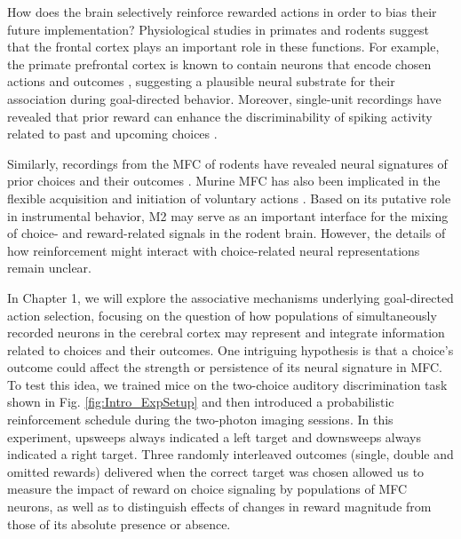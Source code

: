 How does the brain selectively reinforce rewarded actions in order to bias their future implementation? Physiological studies in primates and rodents suggest that the frontal cortex plays an important role in these functions. For example, the primate prefrontal cortex is known to contain neurons that encode chosen actions and outcomes \citep{barraclough2004prefrontal,  genovesio2006representation, seo2007dynamic, histed2009learning}, suggesting a plausible neural substrate for their association during goal-directed behavior. Moreover, single-unit recordings have revealed that prior reward can enhance the discriminability of spiking activity related to past \citep{donahue2013cortical} and upcoming choices \citep{histed2009learning}.

Similarly, recordings from the MFC of rodents have revealed neural signatures of prior choices and their outcomes \citep{sul2010distinct, sul2011role, hyman2017novel}. Murine MFC has also been implicated in the flexible acquisition and initiation of voluntary actions \citep{ostlund2009evidence, gremel2013premotor, murakami2014neural, siniscalchi2016fast, barthas2017secondary, makino2017transformation}. Based on its putative role in instrumental behavior, M2 may serve as an important interface for the mixing of choice- and reward-related signals in the rodent brain. However, the details of how reinforcement might interact with choice-related neural representations remain unclear. 

In Chapter 1, we will explore the associative mechanisms underlying goal-directed action selection, focusing on the question of how populations of simultaneously recorded neurons in the cerebral cortex may represent and integrate information related to choices and their outcomes. One intriguing hypothesis is that a choice’s outcome could affect the strength or persistence of its neural signature in MFC. To test this idea, we trained mice on the two-choice auditory discrimination task shown in Fig. \ref{fig:Intro_ExpSetup} and then introduced a probabilistic reinforcement schedule during the two-photon imaging sessions. In this experiment, upsweeps always indicated a left target and downsweeps always indicated a right target. Three randomly interleaved outcomes (single, double and omitted rewards) delivered when the correct target was chosen allowed us to measure the impact of reward on choice signaling by populations of MFC neurons, as well as to distinguish effects of changes in reward magnitude from those of its absolute presence or absence. 

